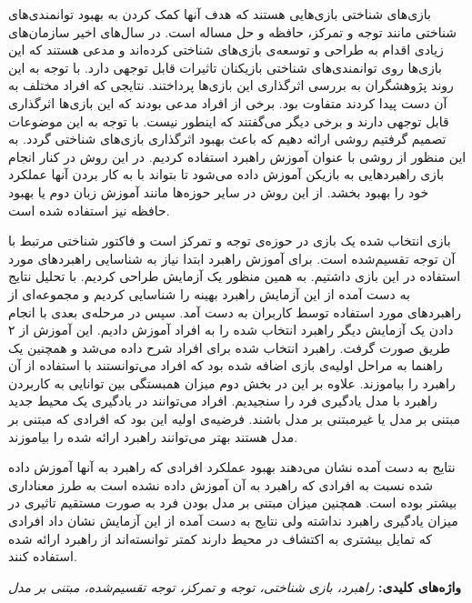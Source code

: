 \documentclass[twoside, a4paper,11pt]{book}
\numberwithin{equation}{chapter}
\numberwithin{table}{chapter}
\numberwithin{figure}{chapter}
\numberwithin{equation}{chapter}
\begin{document}
\begin{spacing}{1.8}

بازی‌های شناختی بازی‌هایی هستند که هدف آنها کمک کردن به بهبود توانمندی‌های شناختی مانند توجه و تمرکز، حافظه و حل مساله است. در سال‌های اخیر سازمان‌های زیادی اقدام به طراحی و توسعه‌ی بازی‌های شناختی کرده‌اند و مدعی هستند که این بازی‌ها روی توانمندی‌های شناختی بازیکنان تاثیرات قابل توجهی دارد. با توجه به این روند پژوهشگران به بررسی اثرگذاری این بازی‌ها پرداختند. نتایجی که افراد مختلف به آن دست پیدا کردند متفاوت بود. برخی از افراد مدعی بودند که این بازی‌ها اثرگذاری قابل توجهی دارند و برخی دیگر می‌گفتند که اینطور نیست. با توجه به این موضوعات تصمیم گرفتیم روشی ارائه دهیم که باعث بهبود اثرگذاری بازی‌های شناختی گردد. به این منظور از روشی با عنوان آموزش راهبرد استفاده کردیم. در این روش در کنار انجام بازی راهبردهایی به بازیکن آموزش داده می‌شود تا بتواند با به کار بردن آنها عملکرد خود را بهبود بخشد. از این روش در سایر حوزه‌ها مانند آموزش زبان دوم یا بهبود حافظه نیز استفاده شده است. 

بازی انتخاب شده یک بازی در حوزه‌ی توجه و تمرکز است و فاکتور شناختی مرتبط با آن توجه تقسیم‌شده است. برای آموزش راهبرد ابتدا نیاز به شناسایی راهبردهای مورد استفاده در این بازی داشتیم. به همین منظور یک آزمایش طراحی کردیم. با تحلیل نتایج به دست آمده از این آزمایش راهبرد بهینه را شناسایی کردیم و مجموعه‌ای از راهبردهای مورد استفاده توسط کاربران به دست آمد. سپس در مرحله‌ی بعدی با انجام دادن یک آزمایش دیگر راهبرد انتخاب شده را به افراد آموزش دادیم. این آموزش از ۲ طریق صورت گرفت. راهبرد انتخاب شده برای افراد شرح داده می‌شد و همچنین یک راهنما به مراحل اولیه‌ی بازی اضافه شده بود که افراد می‌توانستند با استفاده از آن راهبرد را بیاموزند. علاوه بر این در بخش دوم میزان همبستگی بین توانایی به کاربردن راهبرد با مدل یادگیری فرد را سنجیدیم. افراد می‌توانند در یادگیری یک محیط جدید مبتنی بر مدل یا غیرمبتنی بر مدل باشند. فرضیه‌ی اولیه این بود که افرادی که مبتنی بر مدل هستند بهتر می‌توانند راهبرد ارائه شده را بیاموزند.

نتایج به دست آمده نشان می‌دهند بهبود عملکرد افرادی که راهبرد به آنها آموزش داده شده نسبت به افرادی که راهبرد به آن آموزش داده نشده است به طرز معناداری بیشتر بوده است. همچنین میزان مبتنی بر مدل بودن فرد به صورت مستقیم تاثیری در میزان یادگیری راهبرد نداشته ولی نتایج به دست آمده از این آزمایش نشان داد افرادی که تمایل بیشتری به اکتشاف در محیط دارند کمتر توانسته‌اند از راهبرد ارائه شده استفاده کنند.

\textbf{واژه‌های کلیدی: }\textit{راهبرد، بازی شناختی، توجه و تمرکز، توجه تقسیم‌شده، مبتنی بر مدل}
\end{spacing}
\end{document}
